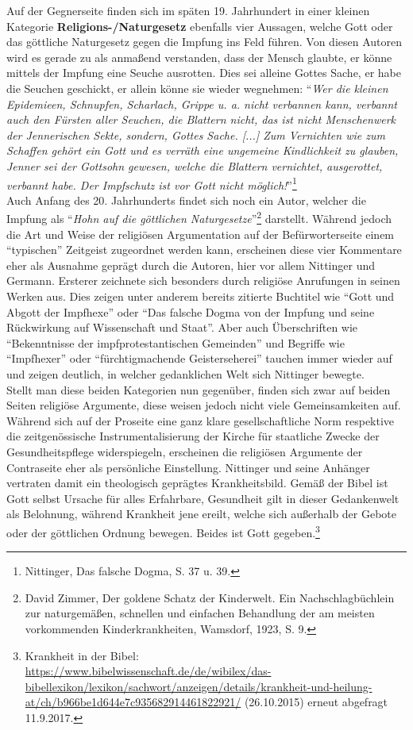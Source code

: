 \documentclass[
    a4paper,
    12pt,
    hyphens,
    chapterprefix=true,
    headheight=33pt,
    footheight=29pt,
    headings=optiontohead,
]{scrartcl}
\begin{document}
{Auf der Gegnerseite finden sich im späten 19. Jahrhundert in einer kleinen Kategorie \textbf{Religions-/Naturgesetz} ebenfalls vier Aussagen, welche Gott oder das göttliche Naturgesetz gegen die Impfung ins Feld führen. Von diesen Autoren wird es gerade zu als anmaßend verstanden, dass der Mensch glaubte, er könne mittels der Impfung eine Seuche ausrotten. Dies sei alleine Gottes Sache, er habe die Seuchen geschickt, er allein könne sie wieder wegnehmen: "`\textit{Wer die kleinen Epidemieen, Schnupfen, Scharlach, Grippe u. a. nicht verbannen kann, verbannt auch den Fürsten aller Seuchen, die Blattern nicht, das ist nicht Menschenwerk der Jennerischen Sekte, sondern, Gottes Sache. [...] Zum Vernichten wie zum Schaffen gehört ein Gott und es verräth eine ungemeine Kindlichkeit zu glauben, Jenner sei der Gottsohn gewesen, welche die Blattern vernichtet, ausgerottet, verbannt habe. Der Impfschutz ist vor Gott nicht möglich!}"'\footnote{Nittinger, Das falsche Dogma, S. 37 u. 39.}\\
Auch Anfang des 20. Jahrhunderts findet sich noch ein Autor, welcher die Impfung als "`\textit{Hohn auf die göttlichen Naturgesetze}"'\footnote{David Zimmer, Der goldene Schatz der Kinderwelt. Ein Nachschlagbüchlein zur naturgemäßen, schnellen und einfachen Behandlung der am meisten vorkommenden Kinderkrankheiten, Wamsdorf, 1923, S. 9. } darstellt. Während jedoch die Art und Weise der religiösen Argumentation auf der Befürworterseite einem "`typischen"' Zeitgeist zugeordnet werden kann, erscheinen diese vier Kommentare eher als Ausnahme geprägt durch die Autoren, hier vor allem Nittinger und Germann. Ersterer zeichnete sich besonders durch religiöse Anrufungen in seinen Werken aus. Dies zeigen unter anderem bereits zitierte Buchtitel wie "`Gott und Abgott der Impfhexe"' oder "`Das falsche Dogma von der Impfung und seine Rückwirkung auf Wissenschaft und Staat"'. Aber auch Überschriften wie "`Bekenntnisse der impfprotestantischen Gemeinden"' und Begriffe wie "`Impfhexer"' oder "`fürchtigmachende Geisterseherei"' tauchen immer wieder auf und zeigen deutlich, in welcher gedanklichen Welt sich Nittinger bewegte.\\
Stellt man diese beiden Kategorien nun gegenüber, finden sich zwar auf beiden Seiten religiöse Argumente, diese weisen jedoch nicht viele Gemeinsamkeiten auf. Während sich auf der Proseite eine ganz klare gesellschaftliche Norm respektive die zeitgenössische Instrumentalisierung der Kirche für staatliche Zwecke der Gesundheitspflege widerspiegeln, erscheinen die religiösen Argumente der Contraseite eher als persönliche Einstellung. Nittinger und seine Anhänger vertraten damit ein theologisch geprägtes Krankheitsbild. Gemäß der Bibel ist Gott selbst Ursache für alles Erfahrbare, Gesundheit gilt in dieser Gedankenwelt als Belohnung, während Krankheit jene ereilt, welche sich außerhalb der Gebote oder der göttlichen Ordnung bewegen. Beides ist Gott gegeben.\footnote{Krankheit in der Bibel:\\ \url{https://www.bibelwissenschaft.de/de/wibilex/das-bibellexikon/lexikon/sachwort/anzeigen/details/krankheit-und-heilung-at/ch/b966be1d644e7c935682914461822921/} (26.10.2015) erneut abgefragt 11.9.2017.}
}
\end{document}
